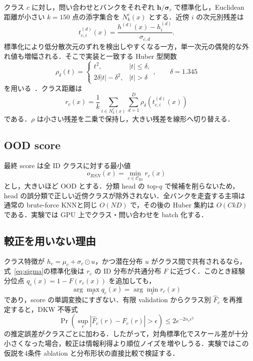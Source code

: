 \documentclass[uplatex,dvipdfmx,a4paper,10pt,twocolumn]{bxjsarticle}
\newcommand{\RSN}{RSN}
\newcommand{\knn}{KNN}
\begin{document}
クラス $c$ に対し，問い合わせとバンクをそれぞれ $\bm{h}/\bm{\sigma}_c$ で標準化し，Euclidean 距離が小さい $k=150$ 点の添字集合を $N_k^c(x)$ とする．近傍 $i$ の次元別残差は
\begin{equation}
  t_{c,i}^{(d)}(x)=\frac{h^{(d)}(x)-h_i^{(d)}}{\sigma_{c,d}}.
\end{equation}
標準化により低分散次元のずれを検出しやすくなる一方，単一次元の偶発的な外れ値も増幅される．そこで実装と一致する Huber 型関数
\begin{equation}
\rho_\delta(t)=
\begin{cases}
t^2,& |t|\le\delta,\\
2\delta|t|-\delta^2,& |t|>\delta
\end{cases},\qquad \delta=1.345
\label{eq:huber}
\end{equation}
を用いる~\cite{huber1964robust}．クラス距離は
\begin{equation}
  r_c(x)=\frac{1}{k}\sum_{i\in N_k^c(x)}\sum_{d=1}^{D}
  \rho_\delta\!\left(t_{c,i}^{(d)}(x)\right)
  \label{eq:classdistance}
\end{equation}
である．$\rho$ は小さい残差を二乗で保持し，大きい残差を線形へ切り替える．

\subsection{OOD score}

最終 score は全 ID クラスに対する最小値
\begin{equation}
  o_{\RSN}(x)=\min_{c\in\mathcal{C}_{\mathrm{ID}}}r_c(x)
  \label{eq:score}
\end{equation}
とし，大きいほど OOD とする．分類 head の top-$q$ で候補を削らないため，head の誤分類で正しい近傍クラスが除外されない．全バンクを走査する主項は通常の brute-force \knn と同じ $O(ND)$ で，その後の Huber 集約は $O(CkD)$ である．実験では GPU 上でクラス・問い合わせを batch 化する．

\subsection{較正を用いない理由}

クラス特徴が $h_c=\mu_c+\sigma_c\odot u$，かつ潜在分布 $u$ がクラス間で共有されるなら，式~\eqref{eq:sigma}の標準化後は $r_c$ の ID 分布が共通分布 $F$ に近づく．このとき経験分位点 $q_c(x)=1-F(r_c(x))$ を追加しても，
\begin{equation}
  \arg\max_c q_c(x)=\arg\min_c r_c(x)
\end{equation}
であり，score の単調変換にすぎない．有限 validation からクラス別 $\hat F_c$ を再推定すると，DKW 不等式~\cite{dkw1956}
\begin{equation}
  \Pr\!\left(\sup_r|\hat F_c(r)-F_c(r)|>\epsilon\right)
  \le 2e^{-2n_c\epsilon^2}
\end{equation}
の推定誤差がクラスごとに加わる．したがって，対角標準化でスケール差が十分小さくなった場合，較正は情報利得より順位ノイズを増やしうる．実験ではこの仮説を4条件 ablation と分布形状の直接比較で検証する．
\end{document}
